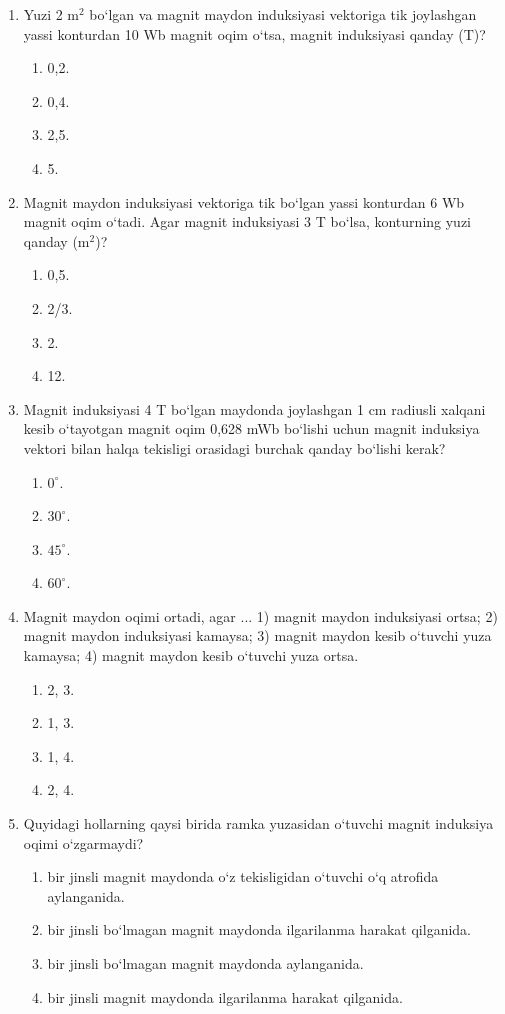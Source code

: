 \begin{enumerate}
\item Yuzi 2 m$^2$ bo‘lgan va magnit maydon induksiyasi vektoriga tik joylashgan yassi konturdan 10 Wb magnit oqim o‘tsa, magnit induksiyasi qanday (T)?
\begin{enumerate}[label=\Alph*)]
\item 0,2.
\item 0,4.
\item 2,5.
\item 5.
\end{enumerate}

\item Magnit maydon induksiyasi vektoriga tik bo‘lgan yassi konturdan 6 Wb magnit oqim o‘tadi. Agar magnit induksiyasi 3 T bo‘lsa, konturning yuzi qanday (m$^2$)?
\begin{enumerate}[label=\Alph*)]
\item 0,5.
\item 2/3.
\item 2.
\item 12.
\end{enumerate}

\item Magnit induksiyasi 4 T bo‘lgan maydonda joylashgan 1 cm radiusli xalqani kesib o‘tayotgan magnit oqim 0,628 mWb bo‘lishi uchun magnit induksiya vektori bilan halqa tekisligi orasidagi burchak qanday bo‘lishi kerak?
\begin{enumerate}[label=\Alph*)]
\item $0^\circ$.
\item $30^\circ$.
\item $45^\circ$.
\item $60^\circ$.
\end{enumerate}

\item Magnit maydon oqimi ortadi, agar ...
1) magnit maydon induksiyasi ortsa;
2) magnit maydon induksiyasi kamaysa;
3) magnit maydon kesib o‘tuvchi yuza kamaysa;
4) magnit maydon kesib o‘tuvchi yuza ortsa.
\begin{enumerate}[label=\Alph*)]
\item 2, 3.
\item 1, 3.
\item 1, 4.
\item 2, 4.
\end{enumerate}

\item Quyidagi hollarning qaysi birida ramka yuzasidan o‘tuvchi magnit induksiya oqimi o‘zgarmaydi? 
\begin{enumerate}[label=\Alph*)]
\item bir jinsli magnit maydonda o‘z tekisligidan o‘tuvchi o‘q atrofida aylanganida.
\item bir jinsli bo‘lmagan magnit maydonda ilgarilanma harakat qilganida.
\item bir jinsli bo‘lmagan magnit maydonda aylanganida.
\item bir jinsli magnit maydonda ilgarilanma harakat qilganida.
\end{enumerate}


\end{enumerate}
